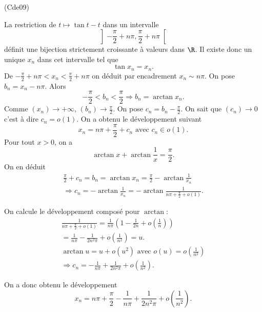 \begin{tiny}(Cde09)\end{tiny} La restriction de $t\mapsto \tan t - t$ dans un intervalle 
\[
 \left] -\frac{\pi}{2} + n\pi , \frac{\pi}{2} + n\pi\right[ 
\]
définit une bijection strictement croissante à valeurs dans $\R$. Il existe donc un unique $x_n$ dans cet intervalle tel que 
\[
 \tan x_n = x_n.
\]
De $-\frac{\pi}{2} + n\pi < x_n < \frac{\pi}{2} + n\pi$ on déduit par encadrement $x_n \sim n\pi$.\newline
On pose $b_n = x_n - n\pi$. Alors
\[
 -\frac{\pi}{2} < b_n < \frac{\pi}{2} \Rightarrow b_n = \arctan x_n.
\]
Comme $(x_n)\rightarrow +\infty$, $(b_n)\rightarrow \frac{\pi}{2}$. On pose $c_n = b_n - \frac{\pi}{2}$. On sait que $(c_n)\rightarrow 0$ c'est à dire $c_n = o(1)$. On a obtenu le développement suivant
\[
 x_n = n\pi + \frac{\pi}{2} + c_n \text{ avec } c_n \in o(1).
\]
Pour tout $x>0$, on a
\[
 \arctan x + \arctan \frac{1}{x} = \frac{\pi}{2}.
\]
On en déduit
\begin{multline*}
 \frac{\pi}{2} + c_n = b_n = \arctan x_n = \frac{\pi}{2} - \arctan \frac{1}{x_n}\\
 \Rightarrow c_n = - \arctan \frac{1}{x_n}
 = - \arctan \frac{1}{n\pi + \frac{\pi}{2} + o(1)}.
\end{multline*}

On calcule le développement composé pour $\arctan$:
\begin{multline*}
 \frac{1}{n\pi + \frac{\pi}{2} + o(1)} = \frac{1}{n\pi}\left( 1 - \frac{1}{2n} + o(\frac{1}{n})\right)\\
 = \frac{1}{n\pi} - \frac{1}{2n^2\pi} + o(\frac{1}{n^2}) = u.\\
\arctan u = u + o(u^2) \text{ avec } o(u) = o(\frac{1}{n^2}) \\
\Rightarrow 
c_n = -\frac{1}{n\pi} + \frac{1}{2n^2\pi} + o(\frac{1}{n^2}). 
\end{multline*}

On a donc obtenu le développement
\[
 x_n = n\pi + \frac{\pi}{2} - \frac{1}{n\pi} + \frac{1}{2n^2\pi} + o(\frac{1}{n^2}).
\]

 
